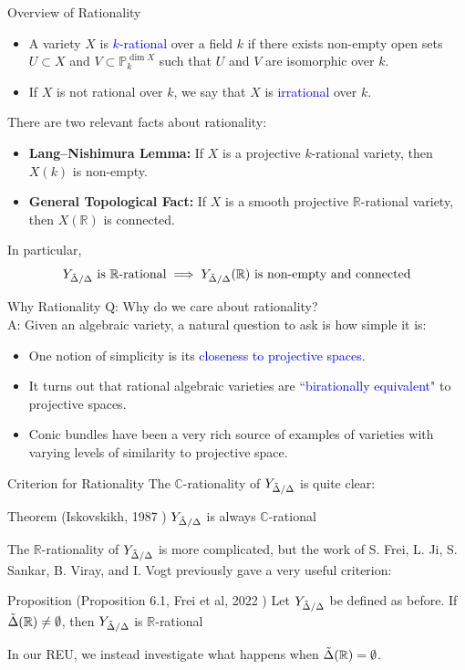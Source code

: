 \documentclass[hyperref, notheorems]{beamer}
\newcommand{\Rbb}{\mathbb{R}}
\newcommand{\Pbb}{\mathbb{P}}
\newcommand{\Cbb}{\mathbb{C}}
\newcommand{\txtblue}{\textcolor{blue}}
\newcommand{\Ydd}{Y_{\Tilde{\Delta} /\Delta}}
\theoremstyle{definition}
\begin{document}
\begin{frame}{Overview of Rationality}
\begin{itemize}
    \item A variety $X$ is \txtblue{$k$-rational} over a field $k$ if there exists non-empty open sets $U \subset X$ and $V \subset \Pbb^{\dim X}_k$ such that $U$ and $V$ are isomorphic over $k$.
    \item If $X$ is not rational over $k$, we say that $X$ is \txtblue{irrational} over $k$.
\end{itemize}

There are two relevant facts about rationality:
\begin{itemize}
    \item \textbf{Lang–Nishimura Lemma: } If $X$ is a projective $k$-rational variety, then $X(k)$ is non-empty.
    \item \textbf{General Topological Fact: } If $X$ is a smooth projective $\Rbb$-rational variety, then $X(\Rbb)$ is connected.
\end{itemize}

In particular,
\[\Ydd \text{ is $\Rbb$-rational} \implies \text{$\Ydd(\Rbb)$ is non-empty and connected}\]
\end{frame}

\begin{frame}{Why Rationality}
   Q: Why do we care about rationality?
    \vspace{\baselineskip}\\
    A: Given an algebraic variety, a natural question to ask is how simple it is:
    \begin{itemize}
        \item One notion of simplicity is its \txtblue{closeness to projective spaces}.
        \item It turns out that rational algebraic varieties are \txtblue{``birationally equivalent"} to projective spaces.
        \item Conic bundles have been a very rich source of examples of varieties with varying levels of similarity to projective space.
    \end{itemize}
\end{frame}

\begin{frame}{Criterion for Rationality}
The $\Cbb$-rationality of $\Ydd$ is quite clear:

\begin{block}{Theorem (Iskovskikh, 1987 \cite{Iskovskikh-rationality-cbs})}
    $\Ydd$ is always $\Cbb$-rational
\end{block}
The $\Rbb$-rationality of $\Ydd$ is more complicated, but the work of S. Frei, L. Ji, S. Sankar, B. Viray, and I. Vogt previously gave a very useful criterion:
\begin{block}{Proposition (Proposition 6.1, Frei et al, 2022 \cite{FJSVV})}
    Let $\Ydd$ be defined as before. If $\Tilde{\Delta}(\Rbb) \neq \emptyset$, then $\Ydd$ is $\Rbb$-rational
\end{block}
In our REU, we instead investigate what happens when $\Tilde{\Delta}(\Rbb) = \emptyset$.
\end{frame}
\end{document}
